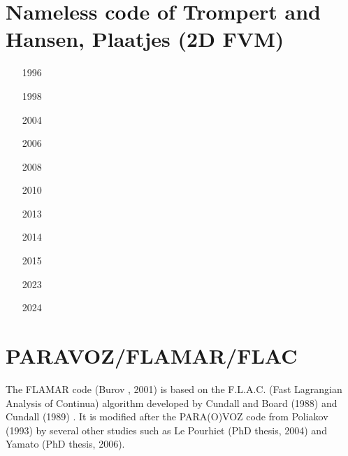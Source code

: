 

\section{Nameless code of Trompert and Hansen, Plaatjes (2D FVM)}

\begin{small}
\begin{itemize}
\item[1996]
\textcite{trha96}
\item[1998]
\textcite{trha98}\textcite{trha98b}
\item[2004]
\textcite{goch04}
\item[2006]
\textcite{losh06}
\item[2008]
\textcite{loha08}\textcite{stha08}
\item[2010]
\textcite{stfh10}
\item[2013]
\textcite{stlh13}
\textcite{stha13}
\item[2014]
\textcite{stha14}
\item[2015]
\textcite{tosn15}
\item[2023]
\textcite{stha23}
\item[2024]
\textcite{stha24}
\end{itemize}
\end{small} 



\section{PARAVOZ/FLAMAR/FLAC}

The FLAMAR code (Burov \etal, 2001) is based on the
F.L.A.C. (Fast Lagrangian Analysis of Continua) algorithm developed by Cundall and Board (1988) 
and Cundall (1989) \cite{cund89}. It is modified after the PARA(O)VOZ code from 
Poliakov \etal (1993) \cite{pocp93} by several
other studies such as Le Pourhiet (PhD thesis, 2004) and Yamato (PhD thesis, 2006).

